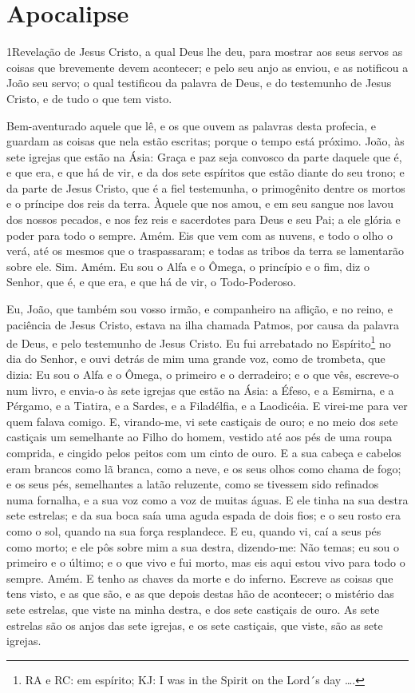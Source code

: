 \thispagestyle{empty}
\chapter*{Apocalipse}

\lettrine{1} Revelação de Jesus Cristo, a qual Deus lhe deu,
para mostrar aos seus servos as coisas que brevemente devem
acontecer; e pelo seu anjo as enviou, e as notificou a João seu
servo; o qual testificou da palavra de Deus, e do testemunho de
Jesus Cristo, e de tudo o que tem visto.

Bem-aventurado aquele que lê, e os que ouvem as palavras desta
profecia, e guardam as coisas que nela estão escritas; porque o
tempo está próximo. João, às sete igrejas que estão na Ásia:
Graça e paz seja convosco da parte daquele que é, e que era, e que
há de vir, e da dos sete espíritos que estão diante do seu trono;
e da parte de Jesus Cristo, que é a fiel testemunha, o
primogênito dentre os mortos e o príncipe dos reis da terra. Àquele
que nos amou, e em seu sangue nos lavou dos nossos pecados, e
nos fez reis e sacerdotes para Deus e seu Pai; a ele glória e poder
para todo o sempre. Amém. Eis que vem com as nuvens, e todo o
olho o verá, até os mesmos que o traspassaram; e todas as tribos da
terra se lamentarão sobre ele. Sim. Amém. Eu sou o Alfa e o
Ômega, o princípio e o fim, diz o Senhor, que é, e que era, e que há
de vir, o Todo-Poderoso.

Eu, João, que também sou vosso irmão, e companheiro na aflição, e
no reino, e paciência de Jesus Cristo, estava na ilha chamada
Patmos, por causa da palavra de Deus, e pelo testemunho de Jesus
Cristo. Eu fui arrebatado no Espírito\footnote{RA e RC: em
espírito; KJ: I was in the Spirit on the Lord´s day \ldots{}.} no
dia do Senhor, e ouvi detrás de mim uma grande voz, como de
trombeta, que dizia: Eu sou o Alfa e o Ômega, o primeiro e o
derradeiro; e o que vês, escreve-o num livro, e envia-o às sete
igrejas que estão na Ásia: a Éfeso, e a Esmirna, e a Pérgamo, e a
Tiatira, e a Sardes, e a Filadélfia, e a Laodicéia. E
virei-me para ver quem falava comigo. E, virando-me, vi sete
castiçais de ouro; e no meio dos sete castiçais um semelhante
ao Filho do homem, vestido até aos pés de uma roupa comprida, e
cingido pelos peitos com um cinto de ouro. E a sua cabeça e
cabelos eram brancos como lã branca, como a neve, e os seus olhos
como chama de fogo; e os seus pés, semelhantes a latão
reluzente, como se tivessem sido refinados numa fornalha, e a sua
voz como a voz de muitas águas. E ele tinha na sua destra
sete estrelas; e da sua boca saía uma aguda espada de dois fios; e o
seu rosto era como o sol, quando na sua força resplandece. E
eu, quando vi, caí a seus pés como morto; e ele pôs sobre mim a sua
destra, dizendo-me: Não temas; eu sou o primeiro e o último;
e o que vivo e fui morto, mas eis aqui estou vivo para todo o
sempre. Amém. E tenho as chaves da morte e do inferno.
Escreve as coisas que tens visto, e as que são, e as que
depois destas hão de acontecer; o mistério das sete estrelas,
que viste na minha destra, e dos sete castiçais de ouro. As sete
estrelas são os anjos das sete igrejas, e os sete castiçais, que
viste, são as sete igrejas.

